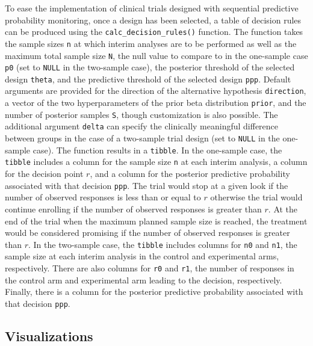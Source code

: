 To ease the implementation of clinical trials designed with sequential
predictive probability monitoring, once a design has been selected, a
table of decision rules can be produced using the
\texttt{calc\_decision\_rules()} function. The function takes the sample
sizes \texttt{n} at which interim analyses are to be performed as well
as the maximum total sample size \texttt{N}, the null value to compare
to in the one-sample case \texttt{p0} (set to \texttt{NULL} in the
two-sample case), the posterior threshold of the selected design
\texttt{theta}, and the predictive threshold of the selected design
\texttt{ppp}. Default arguments are provided for the direction of the
alternative hypothesis \texttt{direction}, a vector of the two
hyperparameters of the prior beta distribution \texttt{prior}, and the
number of posterior samples \texttt{S}, though customization is also
possible. The additional argument \texttt{delta} can specify the
clinically meaningful difference between groups in the case of a
two-sample trial design (set to \texttt{NULL} in the one-sample case).
The function results in a \texttt{tibble}. In the one-sample case, the
\texttt{tibble} includes a column for the sample size \texttt{n} at each
interim analysis, a column for the decision point \(r\), and a column
for the posterior predictive probability associated with that decision
\texttt{ppp}. The trial would stop at a given look if the number of
observed responses is less than or equal to \(r\) otherwise the trial
would continue enrolling if the number of observed responses is greater
than \(r\). At the end of the trial when the maximum planned sample size
is reached, the treatment would be considered promising if the number of
observed responses is greater than \(r\). In the two-sample case, the
\texttt{tibble} includes columns for \texttt{n0} and \texttt{n1}, the
sample size at each interim analysis in the control and experimental
arms, respectively. There are also columns for \texttt{r0} and
\texttt{r1}, the number of responses in the control arm and experimental
arm leading to the decision, respectively. Finally, there is a column
for the posterior predictive probability associated with that decision
\texttt{ppp}.

\hypertarget{visualizations}{%
\subsection{Visualizations}\label{visualizations}}

